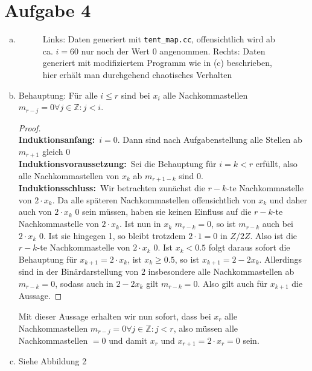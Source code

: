 \documentclass{article}
\theoremstyle{definition}
\newcommand{\Z}{\mathbb{Z}}
\newcommand{\induktion}[3]
{\begin{proof}\ \\
	\noindent\textbf{Induktionsanfang:}\ #1\\
	\noindent\textbf{Induktionsvoraussetzung:}\ #2\\
	\noindent\textbf{Induktionsschluss:}\ #3
\end{proof}}
\begin{document}
\section*{Aufgabe 4}
\begin{enumerate}[(a)]
	\item 
	\begin{figure}
		\caption{Links: Daten generiert mit \lstinline{tent_map.cc}, offensichtlich wird ab ca. $i=60$ nur noch der Wert 0 angenommen. Rechts: Daten generiert mit modifiziertem Programm wie in (c) beschrieben, hier erhält man durchgehend chaotisches Verhalten}
	\end{figure}
	\item Behauptung: Für alle $i \leq r$ sind bei $x_i$ alle Nachkommastellen $m_{r-j} = 0 \forall j\in \Z: j < i$.
	\induktion{$i=0$. Dann sind nach Aufgabenstellung alle Stellen ab $m_{r+1}$ gleich 0}{Sei die Behauptung für $i=k < r$ erfüllt, also alle Nachkommastellen von $x_k$ ab $m_{r+1 - k}$ sind 0.}{Wir betrachten zunächst die $r-k$-te Nachkommastelle von $2 \cdot x_k$. Da alle späteren Nachkommastellen offensichtlich von $x_k$ und daher auch von $2\cdot x_k$ 0 sein müssen, haben sie keinen Einfluss auf die $r-k$-te Nachkommastelle von $2 \cdot x_k$. Ist nun in $x_k$ $m_{r-k} = 0$, so ist $m_{r-k}$ auch bei $2\cdot x_k$ 0. Ist sie hingegen 1, so bleibt trotzdem $2\cdot 1= 0$ in $Z/2Z$. Also ist die $r-k$-te Nachkommastelle von $2\cdot x_k$ 0. Ist $x_k < 0.5$ folgt daraus sofort die Behauptung für $x_{k+1} = 2\cdot x_k$, ist $x_k \geq 0.5$, so ist $x_{k+1} = 2 - 2x_k$. Allerdings sind in der Binärdarstellung von $2$ insbesondere alle Nachkommastellen ab $m_{r-k} = 0$, sodass auch in $2 - 2x_k$ gilt $m_{r-k} = 0$. Also gilt auch für $x_{k+1}$ die Aussage.}
	Mit dieser Aussage erhalten wir nun sofort, dass bei $x_r$ alle Nachkommastellen $m_{r - j} = 0\forall j \in \Z: j < r$, also müssen alle Nachkommastellen $=0$ und damit $x_r$ und $x_{r+1} = 2\cdot x_r = 0$ sein.
	\item Siehe Abbildung 2
\end{enumerate}
\end{document}
